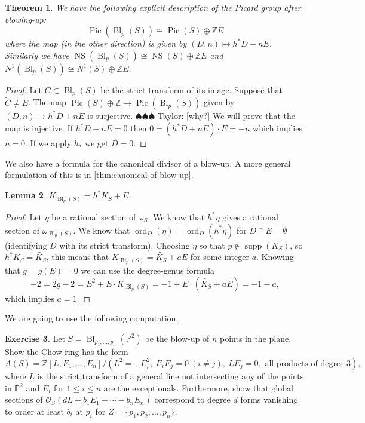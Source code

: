 \documentclass[12pt]{article}
\numberwithin{equation}{section}
\newtheorem{theorem}{Theorem}[subsection]
\newtheorem{lemma}[theorem]{Lemma}
\theoremstyle{definition}
\newtheorem{exercise}[theorem]{Exercise}
\theoremstyle{remark}
\newcommand{\ZZ}{\mathbb{Z}}
\newcommand{\Ocal}{\mathcal{O}}
\newcommand{\PP}{\mathbb{P}}
\newcommand{\ord}{\operatorname{ord}}
\newcommand{\Pic}{\operatorname{Pic}}
\newcommand{\Bl}{\operatorname{Bl}}
\newcommand{\NS}{\operatorname{NS}}
\newcommand{\taylor}[1]{{\color{blue} \sf $\spadesuit\spadesuit\spadesuit$ Taylor: [#1]}}
\begin{document}
\begin{theorem}
	We have the following explicit description of the Picard group after blowing-up:
	$$\Pic(\Bl_p(S)) \cong \Pic(S) \oplus \ZZ E$$
	where the map (in the other direction) is given by $(D,n) \mapsto h^*D+nE$.
	Similarly we have $\NS(\Bl_p(S)) \cong \NS(S)\oplus \ZZ E$ and $N^1(\Bl_p(S)) \cong N^1(S)\oplus \ZZ E$.
\end{theorem}
\begin{proof}
	Let $\widetilde{C} \subset \Bl_p(S)$ be the strict transform of its image.
	Suppose that $\widetilde{C}\neq E$. 
	The map $\Pic(S)\oplus \ZZ \to \Pic(\Bl_p(S))$ given by $(D,n) \mapsto h^*D+nE$ is surjective. \taylor{why?}
	We will prove that the map is injective.
	If $h^*D+nE=0$ then 
	$0 = (h^*D+nE)\cdot E = -n$
	which implies $n=0$. 
	If we apply $h_*$ we get $D=0$.
\end{proof}

We also have a formula for the canonical divisor of a blow-up. 
A more general formulation of this is in \ref{thm:canonical-of-blow-up}.
\begin{lemma}\label{lem:canonical-of-blow-up}
	$K_{\Bl_p(S)}=h^*K_S + E$.
\end{lemma}
\begin{proof} 
	Let $\eta$ be a rational section of $\omega_S$. 
	We know that $h^*\eta$ gives a rational section of $\omega_{\Bl_p(S)}$. 
	We know that $\ord_D(\eta)=\ord_D(h^*\eta)$ for $D\cap E=\emptyset$ (identifying $D$ with its strict transform). 
	Choosing $\eta$ so that $p\notin \operatorname{supp}(K_S)$, so $h^*K_S=\widetilde{K_S}$, this means that $K_{\Bl_p(S)} = \widetilde{K_S}+aE$ for some integer $a$. 
	Knowing that $g=g(E)=0$ we can use the degree-genus formula
	$$-2=2g-2=E^2 + E\cdot K_{\Bl_p(S)}= -1+E\cdot(\widetilde{K_S}+aE)=-1-a,$$
	which implies $a=1$.
\end{proof}

We are going to use the following computation. 
\begin{exercise}\label{ex:chow-ring-of-blow-up}
	Let $S=\Bl_{p_1,\ldots,p_n}(\PP^2)$ be the blow-up of $n$ points in the plane. 
	Show the Chow ring has the form
	$$A(S) = \ZZ[L,E_1,\ldots,E_n]/(L^2=-E_i^2,\ E_iE_j=0 \ (i\neq j),\ LE_j=0, \text{ all products of degree } 3),$$
	where $L$ is the strict transform of a general line not intersecting any of the points in $\PP^2$ and $E_i$ for $1\leq i \leq n$ are the exceptionals.
	Furthermore, show that global sections of $\Ocal_S(dL-b_1E_1-\cdots-b_nE_n)$ correspond to degree $d$ forms vanishing to order at least $b_i$ at $p_i$ for $Z=\lbrace p_1,p_2,\ldots, p_n\rbrace$. 
\end{exercise}
\end{document}
